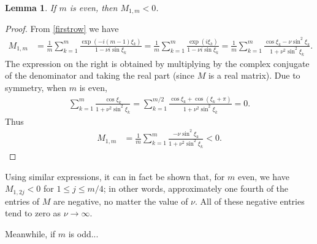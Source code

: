 \documentclass[a4paper]{article}
\newtheorem{lemma}{Lemma}
\begin{document}
\begin{lemma}
    If $m$ is even, then $M_{1,m} < 0$.
\end{lemma}
\begin{proof}
    From \eqref{firstrow} we have
    \begin{align}  \label{M12}
        M_{1,m} & = \frac{1}{m} \sum_{k=1}^m \frac{ \exp(-i(m-1)\xi_k)}{1-\nu i \sin\xi_k}
                  = \frac{1}{m} \sum_{k=1}^m \frac{ \exp(i\xi_k)}{1-\nu i \sin\xi_k}
                  = \frac{1}{m} \sum_{k=1}^m \frac{\cos \xi_k - \nu \sin^2 \xi_k}{1+\nu^2 \sin^2 \xi_k}.
    \end{align}
    The expression on the right is obtained by multiplying by the complex
    conjugate of the denominator and taking the real part (since $M$ is a real matrix).
    Due to symmetry, when $m$ is even,
    \begin{align*}
        \sum_{k=1}^m \frac{\cos \xi_k}{1+\nu^2\sin^2\xi_k}  = \sum_{k=1}^{m/2} \frac{\cos \xi_k + \cos(\xi_k+\pi)}{1+\nu^2\sin^2\xi_k} = 0.
    \end{align*}
    Thus 
    \begin{align*} 
        M_{1,m} & = \frac{1}{m} \sum_{k=1}^m \frac{- \nu \sin^2 \xi_k}{1+\nu^2 \sin^2 \xi_k} < 0.
    \end{align*}
\end{proof}
Using similar expressions, it can in fact be shown that, for $m$ even, we have
$M_{1,2j}<0$ for $1\le j \le m/4$; in other words, approximately one fourth of
the entries of $M$ are negative, no matter the value of $\nu$.  All of these
negative entries tend to zero as $\nu \to \infty$.

Meanwhile, if $m$ is odd...
\end{document}
